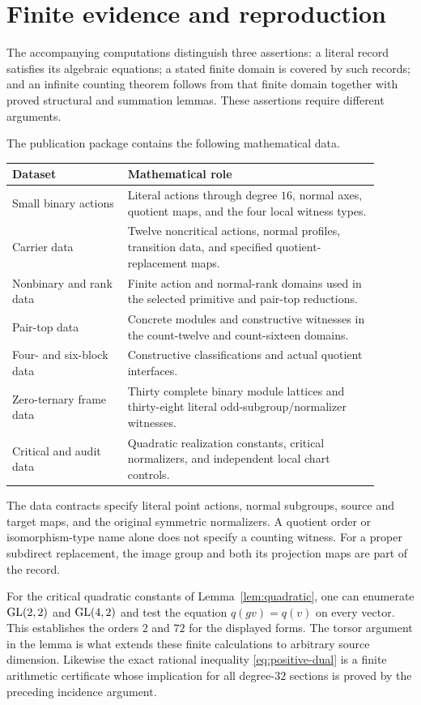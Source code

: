\section{Finite evidence and reproduction}\label{sec:certificates}
The accompanying computations distinguish three assertions: a literal
record satisfies its algebraic equations; a stated finite domain is
covered by such records; and an infinite counting theorem follows from
that finite domain together with proved structural and summation
lemmas. These assertions require different arguments.

The publication package contains the following mathematical data.
\begin{center}
\begin{tabular}{p{0.29\linewidth}p{0.61\linewidth}}
\toprule
Dataset & Mathematical role\\
\midrule
Small binary actions & Literal actions through degree $16$, normal
axes, quotient maps, and the four local witness types.\\
Carrier data & Twelve noncritical actions, normal profiles, transition
data, and specified quotient-replacement maps.\\
Nonbinary and rank data & Finite action and normal-rank domains used
in the selected primitive and pair-top reductions.\\
Pair-top data & Concrete modules and constructive witnesses in the
count-twelve and count-sixteen domains.\\
Four- and six-block data & Constructive classifications and actual
quotient interfaces.\\
Zero-ternary frame data & Thirty complete binary module lattices and
thirty-eight literal odd-subgroup/normalizer witnesses.\\
Critical and audit data & Quadratic realization constants, critical
normalizers, and independent local chart controls.\\
\bottomrule
\end{tabular}
\end{center}
The data contracts specify literal point actions, normal subgroups,
source and target maps, and the original symmetric normalizers. A
quotient order or isomorphism-type name alone does not specify a
counting witness. For a proper subdirect replacement, the image group
and both its projection maps are part of the record.

For the critical quadratic constants of Lemma~\ref{lem:quadratic},
one can enumerate $\operatorname{GL}(2,2)$ and $\operatorname{GL}(4,2)$ and test the equation
$q(gv)=q(v)$ on every vector. This establishes the orders $2$ and $72$
for the displayed forms. The torsor argument in the lemma is what
extends these finite calculations to arbitrary source dimension.
Likewise the exact rational inequality \eqref{eq:positive-dual} is a
finite arithmetic certificate whose implication for all degree-$32$
sections is proved by the preceding incidence argument.

